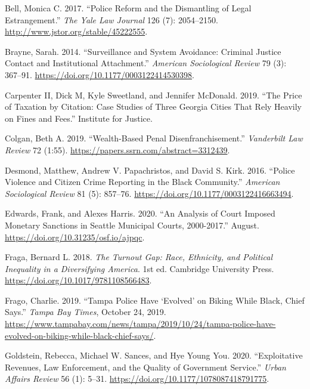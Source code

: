 \documentclass[
  12pt,
]{article}
\newlength{\cslhangindent}
\newenvironment{cslreferences}%
  {\setlength{\parindent}{0pt}%
  \everypar{\setlength{\hangindent}{\cslhangindent}}\ignorespaces}%
  {\par}
\begin{document}
\hypertarget{refs}{}
\begin{cslreferences}
\leavevmode\hypertarget{ref-Bell2017}{}%
Bell, Monica C. 2017. ``Police Reform and the Dismantling of Legal Estrangement.'' \emph{The Yale Law Journal} 126 (7): 2054--2150. \url{http://www.jstor.org/stable/45222555}.

\leavevmode\hypertarget{ref-Brayne2014}{}%
Brayne, Sarah. 2014. ``Surveillance and System Avoidance: Criminal Justice Contact and Institutional Attachment.'' \emph{American Sociological Review} 79 (3): 367--91. \url{https://doi.org/10.1177/0003122414530398}.

\leavevmode\hypertarget{ref-CarpenterII2019}{}%
Carpenter II, Dick M, Kyle Sweetland, and Jennifer McDonald. 2019. ``The Price of Taxation by Citation: Case Studies of Three Georgia Cities That Rely Heavily on Fines and Fees.'' Institute for Justice.

\leavevmode\hypertarget{ref-Colgan2019}{}%
Colgan, Beth A. 2019. ``Wealth-Based Penal Disenfranchisement.'' \emph{Vanderbilt Law Review} 72 (1:55). \url{https://papers.ssrn.com/abstract=3312439}.

\leavevmode\hypertarget{ref-Desmond2016}{}%
Desmond, Matthew, Andrew V. Papachristos, and David S. Kirk. 2016. ``Police Violence and Citizen Crime Reporting in the Black Community.'' \emph{American Sociological Review} 81 (5): 857--76. \url{https://doi.org/10.1177/0003122416663494}.

\leavevmode\hypertarget{ref-Edwards2020}{}%
Edwards, Frank, and Alexes Harris. 2020. ``An Analysis of Court Imposed Monetary Sanctions in Seattle Municipal Courts, 2000-2017.'' August. \url{https://doi.org/10.31235/osf.io/ajpqc}.

\leavevmode\hypertarget{ref-Fraga2018}{}%
Fraga, Bernard L. 2018. \emph{The Turnout Gap: Race, Ethnicity, and Political Inequality in a Diversifying America}. 1st ed. Cambridge University Press. \url{https://doi.org/10.1017/9781108566483}.

\leavevmode\hypertarget{ref-Frago2019}{}%
Frago, Charlie. 2019. ``Tampa Police Have `Evolved' on Biking While Black, Chief Says.'' \emph{Tampa Bay Times}, October 24, 2019. \url{https://www.tampabay.com/news/tampa/2019/10/24/tampa-police-have-evolved-on-biking-while-black-chief-says/}.

\leavevmode\hypertarget{ref-Goldstein2020}{}%
Goldstein, Rebecca, Michael W. Sances, and Hye Young You. 2020. ``Exploitative Revenues, Law Enforcement, and the Quality of Government Service.'' \emph{Urban Affairs Review} 56 (1): 5--31. \url{https://doi.org/10.1177/1078087418791775}.


\end{cslreferences}
\end{document}
